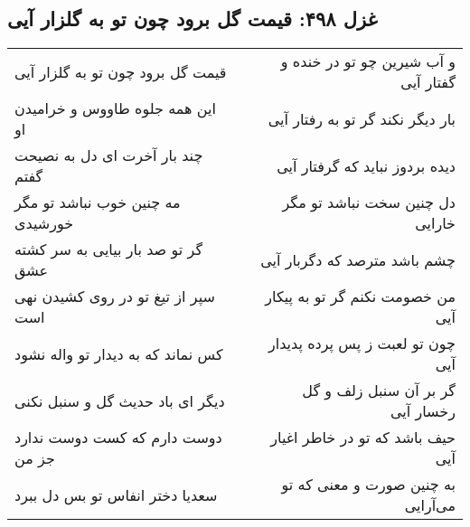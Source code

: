 \begin{center}
\section*{غزل ۴۹۸: قیمت گل برود چون تو به گلزار آیی}
\label{sec:498}
\begin{longtable}{l p{0.5cm} r}
قیمت گل برود چون تو به گلزار آیی
&&
و آب شیرین چو تو در خنده و گفتار آیی
\\
این همه جلوه طاووس و خرامیدن او
&&
بار دیگر نکند گر تو به رفتار آیی
\\
چند بار آخرت ای دل به نصیحت گفتم
&&
دیده بردوز نباید که گرفتار آیی
\\
مه چنین خوب نباشد تو مگر خورشیدی
&&
دل چنین سخت نباشد تو مگر خارایی
\\
گر تو صد بار بیایی به سر کشته عشق
&&
چشم باشد مترصد که دگربار آیی
\\
سپر از تیغ تو در روی کشیدن نهی است
&&
من خصومت نکنم گر تو به پیکار آیی
\\
کس نماند که به دیدار تو واله نشود
&&
چون تو لعبت ز پس پرده پدیدار آیی
\\
دیگر ای باد حدیث گل و سنبل نکنی
&&
گر بر آن سنبل زلف و گل رخسار آیی
\\
دوست دارم که کست دوست ندارد جز من
&&
حیف باشد که تو در خاطر اغیار آیی
\\
سعدیا دختر انفاس تو بس دل ببرد
&&
به چنین صورت و معنی که تو می‌آرایی
\\
\end{longtable}
\end{center}
